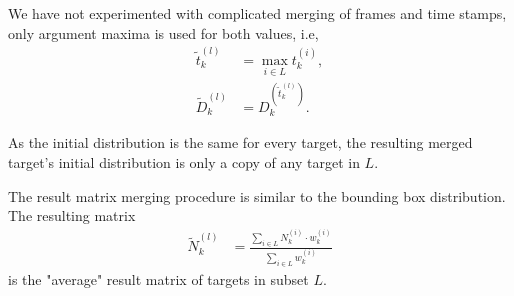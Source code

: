 We have not experimented with complicated merging of frames and time stamps, only argument maxima is used for both
values, i.e,
\begin{align}
  \tilde{t}_k^{(l)} &= \max_{i \in L} t_k^{(i)}, \\
  \tilde{D}_k^{(l)} &= D_k^{(\tilde{t}_k^{(l)})}.
\end{align}

As the initial distribution is the same for every target, the resulting merged target's initial distribution is only a
copy of any target in $L$.

The result matrix merging procedure is similar to the bounding box distribution. The resulting matrix
\begin{align}
  \tilde{N}_k^{(l)} &= \frac{\sum_{i \in L} N_k^{(i)} \cdot w_k^{(i)}}{\sum_{i \in L}{w_k^{(i)}}}
\end{align}
is the "average" result matrix of targets in subset $L$.

